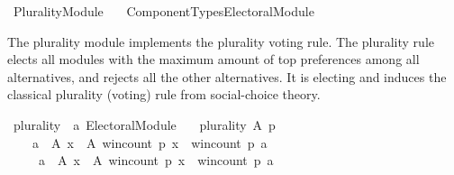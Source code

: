 %
\begin{isabellebody}%
%
%
\isadelimdocument
\isanewline
%
\endisadelimdocument
%
\isatagdocument
\isanewline
\isanewline
%
\isamarkuptrue%
%
\endisatagdocument
{\isafolddocument}%
%
\isadelimdocument
%
\endisadelimdocument
%
\isadelimtheory
%
\endisadelimtheory
%
\isatagtheory
{}\isamarkupfalse%
\ Plurality{\isacharunderscore}{\kern0pt}Module\isanewline
\ \ \ {\isachardoublequoteopen}Component{\isacharunderscore}{\kern0pt}Types{\isacharslash}{\kern0pt}Electoral{\isacharunderscore}{\kern0pt}Module{\isachardoublequoteclose}\isanewline
{}%
\endisatagtheory
{\isafoldtheory}%
%
\isadelimtheory
%
\endisadelimtheory
%
\begin{isamarkuptext}%
The plurality module implements the plurality voting rule.
The plurality rule elects all modules with the maximum amount of top
preferences among all alternatives, and rejects all the other alternatives.
It is electing and induces the classical plurality (voting) rule
from social-choice theory.%
\end{isamarkuptext}\isamarkuptrue%
%
\isadelimdocument
%
\endisadelimdocument
%
\isatagdocument
%
\isamarkuptrue%
%
\endisatagdocument
{\isafolddocument}%
%
\isadelimdocument
%
\endisadelimdocument
{}\isamarkupfalse%
\ plurality\ {\isacharcolon}{\kern0pt}{\isacharcolon}{\kern0pt}\ {\isachardoublequoteopen}{\isacharprime}{\kern0pt}a\ Electoral{\isacharunderscore}{\kern0pt}Module{\isachardoublequoteclose}\ \isanewline
\ \ {\isachardoublequoteopen}plurality\ A\ p\ {\isacharequal}{\kern0pt}\isanewline
\ \ \ \ {\isacharparenleft}{\kern0pt}{\isacharbraceleft}{\kern0pt}a\ {\isasymin}\ A{\isachardot}{\kern0pt}\ {\isasymforall}x\ {\isasymin}\ A{\isachardot}{\kern0pt}\ win{\isacharunderscore}{\kern0pt}count\ p\ x\ {\isasymle}\ win{\isacharunderscore}{\kern0pt}count\ p\ a{\isacharbraceright}{\kern0pt}{\isacharcomma}{\kern0pt}\isanewline
\ \ \ \ \ {\isacharbraceleft}{\kern0pt}a\ {\isasymin}\ A{\isachardot}{\kern0pt}\ {\isasymexists}x\ {\isasymin}\ A{\isachardot}{\kern0pt}\ win{\isacharunderscore}{\kern0pt}count\ p\ x\ {\isachargreater}{\kern0pt}\ win{\isacharunderscore}{\kern0pt}count\ p\ a{\isacharbraceright}{\kern0pt}{\isacharcomma}{\kern0pt}\isanewline
\ \ \ \ \ {\isacharbraceleft}{\kern0pt}{\isacharbraceright}{\kern0pt}{\isacharparenright}{\kern0pt}{\isachardoublequoteclose}\isanewline
\isanewline
{}\isamarkupfalse%

\end{isabellebody}
